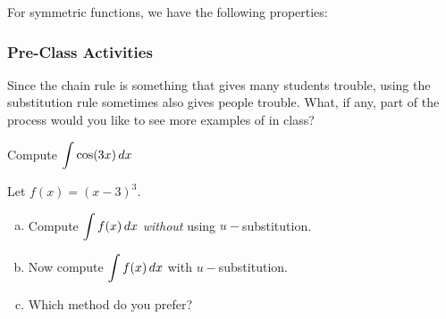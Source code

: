 \documentclass[notes]{subfiles}
\begin{document}
		\begin{rmk}
			For symmetric functions, we have the following properties:\\
		\end{rmk}
			\newpage
	
	\subsubsection*{Pre-Class Activities}
		\begin{ex}
			Since the chain rule is something that gives many students trouble, using the substitution rule sometimes also gives people trouble.  What, if any, part of the process would you like to see more examples of in class?
		\end{ex}
			
		\begin{ex}
			Compute $\displaystyle \int \cos (3x)\, dx$
		\end{ex}
			
		\begin{ex}
			Let $f(x) = (x-3)^3$.
			\begin{enumerate}[(a)]
				\item Compute $\displaystyle \int f(x)\, dx$ \emph{without} using $u-$substitution.
					
				\item Now compute $\displaystyle \int f(x)\, dx$ with $u-$substitution.
					
				\item Which method do you prefer?
			\end{enumerate}
		\end{ex}
			\newpage
			
\end{document}
